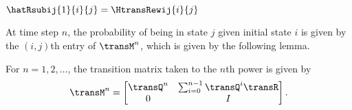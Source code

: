 \begin{mycor}
	\label{cor:hatR1}
	$\hatRsubij{1}{i}{j} = \HtransRewij{i}{j}$
\end{mycor}

At time step $n$, the probability of being in state $j$ given initial state $i$ is given by the $(i, j)$th entry of $\transM^n$, which is given by the following lemma.

\begin{myLemma}
	\label{lem:transM_n}
	For $n = 1, 2, \ldots $, the transition matrix taken to the $n$th power is given by 
	\begin{equation}
	\label{eq:transM_n}
		\transM^n = 
			\begin{bmatrix}
				\transQ^n & \sum_{i = 0}^{n-1} \transQ^{i}\transR \\ 
				0 & I
			\end{bmatrix}.
	\end{equation}
\end{myLemma}

